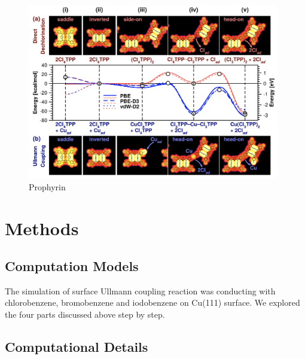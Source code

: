\documentclass[aps,reprint,amsmath,amssymb]{revtex4-2}
\begin{document}
\begin{figure}[ht]
\centering
\includegraphics[width=0.98\textwidth]{Fig/Complete.png}
\caption{Prophyrin}
\label{fig:prophyrin}
\end{figure}



\section{Methods}
\subsection{Computation Models}

The simulation of surface Ullmann coupling reaction was conducting with chlorobenzene, bromobenzene and iodobenzene on Cu(111) surface. We explored the four parts discussed above step by step. 

\subsection{Computational Details}
\end{document}
